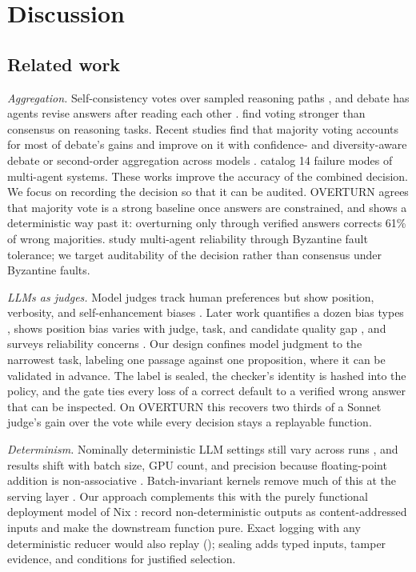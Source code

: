 \section{Discussion}
\label{sec:discussion}

\subsection{Related work}
\label{sec:related}

\emph{Aggregation.} Self-consistency votes over sampled reasoning paths \citep{wang2023selfconsistency}, and debate has agents revise answers after reading each other \citep{du2024debate}. \citet{kaesberg2025voting} find voting stronger than consensus on reasoning tasks. Recent studies find that majority voting accounts for most of debate's gains \citep{choi2025debate,zhang2025stop} and improve on it with confidence- and diversity-aware debate \citep{zhu2026demystifying} or second-order aggregation across models \citep{ai2026beyond}. \citet{cemri2025why} catalog 14 failure modes of multi-agent systems. These works improve the accuracy of the combined decision. We focus on recording the decision so that it can be audited. OVERTURN agrees that majority vote is a strong baseline once answers are constrained, and shows a deterministic way past it: overturning only through verified answers corrects 61\% of wrong majorities. \citet{zheng2025byzantine} study multi-agent reliability through Byzantine fault tolerance; we target auditability of the decision rather than consensus under Byzantine faults.

\emph{LLMs as judges.} Model judges track human preferences but show position, verbosity, and self-enhancement biases \citep{zheng2023judging}. Later work quantifies a dozen bias types \citep{ye2024justice}, shows position bias varies with judge, task, and candidate quality gap \citep{shi2025judging}, and surveys reliability concerns \citep{gu2024survey}. Our design confines model judgment to the narrowest task, labeling one passage against one proposition, where it can be validated in advance. The label is sealed, the checker's identity is hashed into the policy, and the gate ties every loss of a correct default to a verified wrong answer that can be inspected. On OVERTURN this recovers two thirds of a Sonnet judge's gain over the vote while every decision stays a replayable function.

\emph{Determinism.} Nominally deterministic LLM settings still vary across runs \citep{atil2025nondeterminism}, and results shift with batch size, GPU count, and precision because floating-point addition is non-associative \citep{yuan2025numerical}. Batch-invariant kernels remove much of this at the serving layer \citep{he2025nondeterminism}. Our approach complements this with the purely functional deployment model of Nix \citep{dolstra2004nix}: record non-deterministic outputs as content-addressed inputs and make the downstream function pure. Exact logging with any deterministic reducer would also replay (); sealing adds typed inputs, tamper evidence, and conditions for justified selection.

